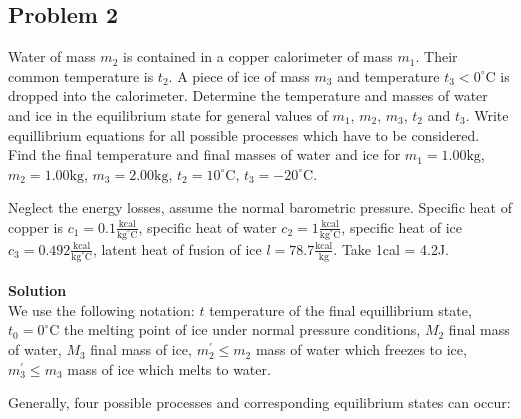 \documentclass[12pt,a4paper]{book}
\begin{document}
	\subsection*{Problem 2}
	Water of mass $m_2$ is contained in a copper calorimeter of mass $m_1$. Their common temperature is $t_2$. A piece of ice of mass $m_3$ and temperature $t_3<0^{\circ}\mathrm{C}$ is dropped into the calorimeter. Determine the temperature and masses of water and ice in the equilibrium state for general values of $m_1$, $m_2$, $m_3$, $t_2$ and $t_3$. Write equillibrium equations for all possible processes which have to be considered. Find the f\mbox{}inal temperature and f\mbox{}inal masses of water and ice for $m_1=1.00\text{kg}$, $m_2=1.00\text{kg}$, $m_3=2.00\text{kg}$, $t_2=10^{\circ}\mathrm{C}$, $t_3=-20^{\circ}\mathrm{C}$.\par
	Neglect the energy losses, assume the normal barometric pressure. Specif\mbox{}ic heat of copper is $c_1=0.1\frac{\text{kcal}}{\text{kg}^{\circ}\mathrm{C}}$, specif\mbox{}ic heat of water $c_2=1\frac{\text{kcal}}{\text{kg}^{\circ}\mathrm{C}}$, specif\mbox{}ic heat of ice $c_3=0.492\frac{\text{kcal}}{\text{kg}^{\circ}\mathrm{C}}$, latent heat of fusion of ice $l=78.7\frac{\text{kcal}}{\text{kg}}$. Take 1cal = 4.2J.\\ \\
	\textbf{Solution}\\
	We use the following notation: $t$ temperature of the f\mbox{}inal equillibrium state, $t_0=0^{\circ}\mathrm{C}$ the melting point of ice under normal pressure conditions, $M_2$ f\mbox{}inal mass of water, $M_3$ f\mbox{}inal mass of ice, $m^{'}_2\leq m_2$ mass of water which freezes to ice, $m^{'}_3\leq m_3$ mass of ice which melts to water.\par
	Generally, four possible processes and corresponding equilibrium states can occur:
\end{document}

